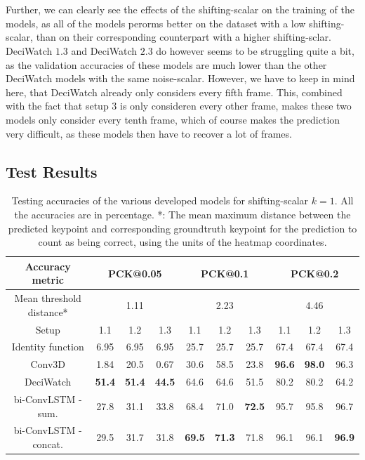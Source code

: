 \documentclass[./main.tex]{subfiles}
\begin{document}
\\
\\
Further, we can clearly see the effects of the shifting-scalar on the training of the models, as all of the models perorms better on the dataset with a low shifting-scalar, than on their corresponding counterpart with a higher shifting-sclar. DeciWatch $1.3$ and DeciWatch $2.3$ do however seems to be struggling quite a bit, as the validation accuracies of these models are much lower than the other DeciWatch models with the same noise-scalar. However, we have to keep in mind here, that DeciWatch already only considers every fifth frame. This, combined with the fact that setup $3$ is only consideren every other frame, makes these two models only consider every tenth frame, which of course makes the prediction very difficult, as these models then have to recover a lot of frames.

\subsection{Test Results}
\begin{table}[htbp]
    \begin{tabular}{c||ccc|ccc|ccc}
        \hline
        Accuracy metric & \multicolumn{3}{c}{PCK@0.05} & \multicolumn{3}{c}{PCK@0.1} & \multicolumn{3}{c}{PCK@0.2} \\
        \hline
        Mean threshold distance* & \multicolumn{3}{c}{1.11} & \multicolumn{3}{c}{2.23} & \multicolumn{3}{c}{4.46} \\
        \hline
        Setup & 1.1 & 1.2 & 1.3 & 1.1 & 1.2 & 1.3 & 1.1 & 1.2 & 1.3 \\
        \hline
        \hline
        Identity function & 6.95 & 6.95 & 6.95 & 25.7 & 25.7 & 25.7 & 67.4 & 67.4 & 67.4 \\
        Conv3D & 1.84 & 20.5 & 0.67 & 30.6 & 58.5 & 23.8 & \textbf{96.6} & \textbf{98.0} & 96.3 \\
        DeciWatch & \textbf{51.4} & \textbf{51.4} & \textbf{44.5} & 64.6 & 64.6 & 51.5 & 80.2 & 80.2 & 64.2 \\
        bi-ConvLSTM - sum. & 27.8 & 31.1 & 33.8 & 68.4 & 71.0 & \textbf{72.5} & 95.7 & 95.8 & 96.7\\
        bi-ConvLSTM - concat. & 29.5 & 31.7 & 31.8 & \textbf{69.5} & \textbf{71.3} & 71.8 & 96.1 & 96.1 & \textbf{96.9} \\
        \hline
    \end{tabular}
    \caption{Testing accuracies of the various developed models for shifting-scalar $k = 1$. All the accuracies are in percentage. *: The mean maximum distance between the predicted keypoint and corresponding groundtruth keypoint for the prediction to count as being correct, using the units of the heatmap coordinates.}
    \label{tab:pretrain_test_accs_1}
\end{table}
\end{document}
